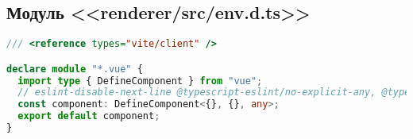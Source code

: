 \subsection{Модуль <<renderer/src/env.d.ts>>}
\begin{lstlisting}[language=typescript]
/// <reference types="vite/client" />

declare module "*.vue" {
  import type { DefineComponent } from "vue";
  // eslint-disable-next-line @typescript-eslint/no-explicit-any, @typescript-eslint/ban-types
  const component: DefineComponent<{}, {}, any>;
  export default component;
}  
\end{lstlisting}
